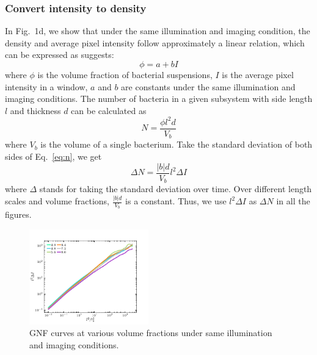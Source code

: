 \documentclass[twocolumn,aps,prx,amsmath,amssymb,longbibliography]{revtex4-2}
\begin{document}
\subsubsection{Convert intensity to density}
In Fig.~1d, we show that under the same illumination and imaging condition, the density and average pixel intensity follow approximately a linear relation, which can be expressed as suggests:
\begin{equation}
  \label{eq:phi-I-relation}
  \phi = a + bI
\end{equation}
where $\phi$ is the volume fraction of bacterial suspensions, $I$ is the average pixel intensity in a window, $a$ and $b$ are constants under the same illumination and imaging conditions. The number of bacteria in a given subsystem with side length $l$ and thickness $d$ can be calculated as
\begin{equation}
  \label{eq:n}
  N = \frac{\phi l^2d}{V_b}
\end{equation}
where $V_b$ is the volume of a single bacterium. Take the standard deviation of both sides of Eq.~\ref{eq:n}, we get
\begin{equation}
  \Delta N = \frac{|b|d}{V_b} l^2\Delta I
\end{equation}
where $\Delta$ stands for taking the standard deviation over time. Over different length scales and volume fractions, $\frac{|b|d}{V_b}$ is a constant. Thus, we use $l^2\Delta I$ as $\Delta N$ in all the figures.


\begin{figure}[t]
	\begin{center}
		\includegraphics[width=0.46\textwidth]{Figures/GNF-normalization/same-illumination.pdf}
		\caption[Density autocorrelation]
		{
			GNF curves at various volume fractions under same illumination and imaging conditions.
		}
		\label{fig:same-conditions}
	\end{center}
\end{figure}

\end{document}
